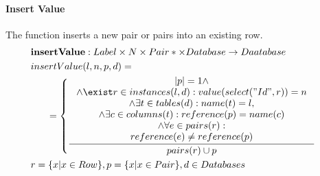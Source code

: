 \documentclass[11pt]{article}
\begin{document}
\paragraph{Insert Value} The function inserts a new pair or pairs into an existing row.
\begin{align*}
&	\mathbf{insertValue} : Label \times N \times Pair* \times Database \rightarrow Daatabase \\
&	insertValue(l, n, p, d) =\\
& \;\;\;\;\;\; =\begin{cases}
 		\inference{|p| = 1 \wedge 
 		\\ \wedge \exist r \in instances(l, d) : value(select("Id", r)) = n
 		\\ \wedge \exists t \in tables(d) : name(t) = l, 
 		\\ \wedge \exists c \in columns(t) : reference(p) = name(c) 
 		\\ \wedge \forall e \in pairs(r) :\\  reference(e) \neq reference(p) }{pairs(r) \cup p} 
 		\end{cases} \\
& r = \{ x | x \in Row\}, p = \{ x | x \in Pair\},d \in Databases
\end{align*}
\end{document}
